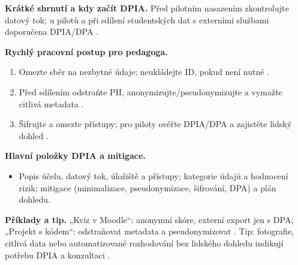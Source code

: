 \textbf{Krátké shrnutí a kdy začít DPIA.} Před pilotním nasazením zkontrolujte datový tok; u pilotů a při sdílení studentských dat s externími službami doporučena DPIA/DPA \cite{kb_ai_101_tipu_pdf_04e4a115_page_8_1}.

\textbf{Rychlý pracovní postup pro pedagoga.}
\begin{enumerate}
\item Omezte sběr na nezbytné údaje; neukládejte ID, pokud není nutné \cite{kb_ai_101_tipu_pdf_04e4a115_page_8_1}.
\item Před sdílením odstraňte PII, anonymizujte/pseudonymizujte a vymažte citlivá metadata \cite{kb_ai_101_tipu_pdf_04e4a115_page_8_1}.
\item Šifrujte a omezte přístupy; pro piloty ověřte DPIA/DPA a zajistěte lidský dohled \cite{kb_ai_101_tipu_pdf_04e4a115_page_8_1,kb_malinka_chatgpt_ve_vyuce_dva_roky_pote_2024_pdf_90bc3aaf_page_12_1}.
\end{enumerate}

\textbf{Hlavní položky DPIA a mitigace.}
\begin{itemize}
\item Popis účelu, datový tok, úložiště a přístupy; kategorie údajů a hodnocení rizik; mitigace (minimalizace, pseudonymizace, šifrování, DPA) a plán dohledu.
\end{itemize}

\textbf{Příklady a tip.} „Kvíz v Moodle“: anonymní skóre, externí export jen s DPA; „Projekt s kódem“: odstraňovat metadata a pseudonymizovat \cite{kb_ai_101_tipu_pdf_04e4a115_page_8_1}. Tip: fotografie, citlivá data nebo automatizované rozhodování bez lidského dohledu indikují potřebu DPIA a konzultaci \cite{kb_ai_101_tipu_pdf_04e4a115_page_8_1,kb_malinka_chatgpt_ve_vyuce_dva_roky_pote_2024_pdf_90bc3aaf_page_12_1}.